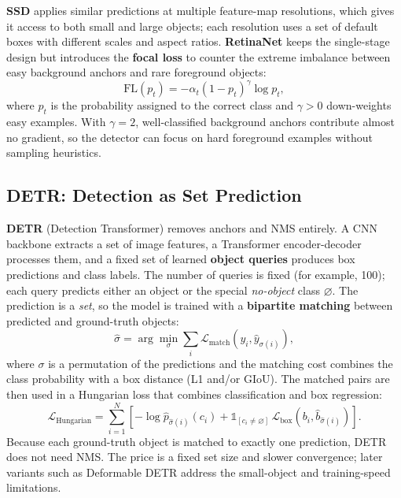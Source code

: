 \textbf{SSD} applies similar predictions at multiple feature-map resolutions, which gives it access to both small and large objects; each resolution uses a set of default boxes with different scales and aspect ratios. \textbf{RetinaNet} keeps the single-stage design but introduces the \textbf{focal loss} to counter the extreme imbalance between easy background anchors and rare foreground objects:
\begin{equation}
    \mathrm{FL}(p_t) = -\alpha_t (1-p_t)^{\gamma}\log p_t,
\end{equation}
where $p_t$ is the probability assigned to the correct class and $\gamma>0$ down-weights easy examples. With $\gamma=2$, well-classified background anchors contribute almost no gradient, so the detector can focus on hard foreground examples without sampling heuristics.

\subsection{DETR: Detection as Set Prediction}

\textbf{DETR} (Detection Transformer) removes anchors and NMS entirely. A CNN backbone extracts a set of image features, a Transformer encoder-decoder processes them, and a fixed set of learned \textbf{object queries} produces box predictions and class labels. The number of queries is fixed (for example, 100); each query predicts either an object or the special \emph{no-object} class $\varnothing$. The prediction is a \emph{set}, so the model is trained with a \textbf{bipartite matching} between predicted and ground-truth objects:
\begin{equation}
    \hat{\sigma} = \arg\min_{\sigma} \sum_{i} \mathcal{L}_{\text{match}}\left(y_i, \hat{y}_{\sigma(i)}\right),
\end{equation}
where $\sigma$ is a permutation of the predictions and the matching cost combines the class probability with a box distance (L1 and/or GIoU). The matched pairs are then used in a Hungarian loss that combines classification and box regression:
\begin{equation}
    \mathcal{L}_{\text{Hungarian}} = \sum_{i=1}^{N}
    \left[-\log \hat{p}_{\hat{\sigma}(i)}(c_i)
    + \mathbb{1}_{[c_i\neq\varnothing]}\,\mathcal{L}_{\text{box}}\left(b_i,\hat{b}_{\hat{\sigma}(i)}\right)\right].
\end{equation}
Because each ground-truth object is matched to exactly one prediction, DETR does not need NMS. The price is a fixed set size and slower convergence; later variants such as Deformable DETR address the small-object and training-speed limitations.

